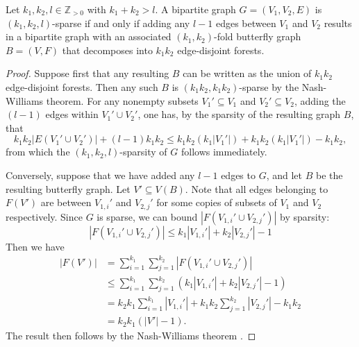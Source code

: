 \documentclass{article}
\begin{document}
\begin{theorem}
    Let $k_1, k_2, l\in \mathbb{Z}_{>0}$ with $k_1+k_2 >l$. A bipartite graph $G=(V_1,V_2,E)$ is $(k_1,k_2,l)$-sparse if and only if adding any $l-1$ edges between $V_1$ and $V_2$ results in a bipartite graph with an associated $(k_1,k_2)$-fold butterfly graph $B=(V, F)$ that decomposes into $k_1k_2$ edge-disjoint forests.
    \label{arboricity}
\end{theorem}
\begin{proof}
Suppose first that any resulting $B$ can be written as the union of $k_1k_2$ edge-disjoint forests. Then any such $B$ is $(k_1k_2, k_1k_2)$-sparse by the Nash-Williams theorem. For any nonempty subsets $V_1' \subseteq V_1$ and $V_2'\subseteq V_2$, adding the $(l-1)$ edges within $V_1' \cup V_2'$, one has, by the sparsity of the resulting graph $B$, that $$k_1k_2| E(V_1' \cup V_2')|+ (l -1)k_1k_2 \leq k_1k_2(k_1| V_1'|) + k_1k_2(k_1| V_1'|) - k_1k_2,$$ from which the $(k_1, k_2, l)$-sparsity of $G$ follows immediately.

 Conversely, suppose that we have added any $l-1$ edges to $G$, and let $B$ be the resulting butterfly graph. Let $V'\subseteq V(B)$. Note that all edges belonging to $F(V')$ are between $V_{1, i}'$ and $V_{2, j}'$ for some copies of subsets of $V_1$ and $V_2$ respectively. Since $G$ is sparse, we can bound $|F(V_{1, i}'\cup  V_{2, j}')|$ by sparsity:
    \begin{equation*}
        |F(V_{1, i}'\cup  V_{2, j}')| \leq k_1 |V_{1, i}'| + k_2 |V_{2, j}'| - 1
    \end{equation*}
    Then we have
    \begin{align*}
        |F(V')| &= \sum_{i=1}^{k_1} \sum_{j=1}^{k_2} |F(V_{1, i}'\cup  V_{2, j}')|\\
        &\leq  \sum_{i=1}^{k_1} \sum_{j=1}^{k_2}\left( k_1 |V_{1, i}'| + k_2 |V_{2, j}'| - 1\right)\\
        &=  k_2 k_1 \sum_{i=1}^{k_1} |V_{1, i}'| + k_1 k_2 \sum_{j=1}^{k_2} |V_{2, j}'| - k_1 k_2\\
        &=  k_2 k_1 (|V'| - 1).
    \end{align*}
    The result then follows by the Nash-Williams theorem \cite{Nash-Williams}. 
\end{proof}
\end{document}

